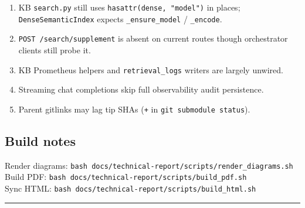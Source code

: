 \documentclass[
  11pt,
]{article}
\providecommand{\tightlist}{%
  \setlength{\itemsep}{0pt}\setlength{\parskip}{0pt}}
\begin{document}
\begin{enumerate}
\def\labelenumi{\arabic{enumi}.}
\tightlist
\item
  KB \texttt{search.py} still uses \texttt{hasattr(dense,\ "model")} in
  places; \texttt{DenseSemanticIndex} expects \texttt{\_ensure\_model} /
  \texttt{\_encode}.\\
\item
  \texttt{POST\ /search/supplement} is absent on current routes though
  orchestrator clients still probe it.\\
\item
  KB Prometheus helpers and \texttt{retrieval\_logs} writers are largely
  unwired.\\
\item
  Streaming chat completions skip full observability audit
  persistence.\\
\item
  Parent gitlinks may lag tip SHAs (\texttt{+} in
  \texttt{git\ submodule\ status}).
\end{enumerate}

\subsection{Build notes}\label{build-notes}

Render diagrams:
\texttt{bash\ docs/technical-report/scripts/render\_diagrams.sh}\\
Build PDF: \texttt{bash\ docs/technical-report/scripts/build\_pdf.sh}\\
Sync HTML: \texttt{bash\ docs/technical-report/scripts/build\_html.sh}

\begin{center}\rule{0.5\linewidth}{0.5pt}\end{center}
\end{document}
